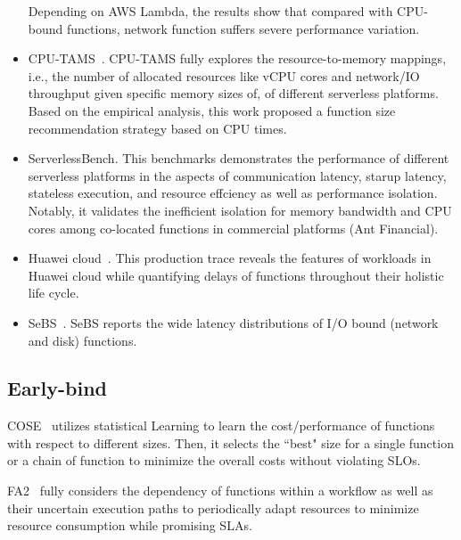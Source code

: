 \begin{itemize}
    Depending on AWS Lambda, the results show that compared with CPU-bound functions, network function suffers severe performance variation.
    \item CPU-TAMS~\cite{ic2e22-cpu-tams}.
    CPU-TAMS fully explores the resource-to-memory mappings, i.e., the number of allocated resources like vCPU cores and network/IO throughput given specific memory sizes of,  of different serverless platforms.
    Based on the empirical analysis, this work proposed a function size recommendation strategy based on CPU times.
    \item ServerlessBench\cite{socc20-serverlessbench}. This benchmarks demonstrates the performance of different serverless platforms in the aspects of communication latency, starup latency, stateless execution, and  resource effciency as well as performance isolation.
    Notably, it validates the inefficient isolation for memory bandwidth and CPU cores among co-located functions in commercial platforms (Ant Financial).
    \item Huawei cloud~\cite{socc23-huawei-cloud}. This production trace reveals the features of workloads in Huawei cloud while quantifying delays of functions throughout their holistic life cycle.
    \item SeBS~\cite{middleware21-sebs}. SeBS reports the wide latency distributions of I/O bound (network and disk) functions.
\end{itemize}


\subsection{Early-bind}




COSE~\cite{infocom20-cose} utilizes statistical Learning to learn the cost/performance of functions with respect to different sizes.
Then, it selects the ``best" size for a single function or a chain of function to minimize the overall costs without violating SLOs.



FA2~\cite{rtas22-fa2} fully considers the dependency of functions within a workflow as well as their uncertain execution paths to periodically adapt resources to minimize resource consumption while promising SLAs.


